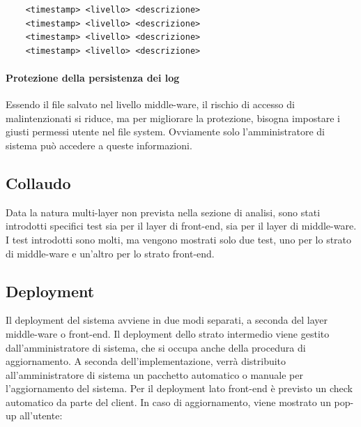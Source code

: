 \documentclass[a4paper]{article}
\begin{document}
\begin{lstlisting}
    <timestamp> <livello> <descrizione>
    <timestamp> <livello> <descrizione>
    <timestamp> <livello> <descrizione>
    <timestamp> <livello> <descrizione>
\end{lstlisting}

\paragraph{Protezione della persistenza dei log} Essendo il file salvato nel livello middle-ware, il rischio di accesso di malintenzionati si riduce, ma per migliorare la protezione, bisogna impostare i giusti permessi utente nel file system. Ovviamente solo l'amministratore di sistema può accedere a queste informazioni.

\newpage

\subsection{Collaudo}

Data la natura multi-layer non prevista nella sezione di analisi, sono stati introdotti specifici test sia per il layer di front-end, sia per il layer di middle-ware. I test introdotti sono molti, ma vengono mostrati solo due test, uno per lo strato di middle-ware e un'altro per lo strato front-end.




\newpage

\subsection{Deployment}

Il deployment del sistema avviene in due modi separati, a seconda del layer middle-ware o front-end. Il deployment dello strato intermedio viene gestito dall'amministratore di sistema, che si occupa anche della procedura di aggiornamento. A seconda dell'implementazione, verrà distribuito all'amministratore di sistema un pacchetto automatico o manuale per l'aggiornamento del sistema. Per il deployment lato front-end è previsto un check automatico da parte del client. In caso di aggiornamento, viene mostrato un pop-up all'utente:
\end{document}
